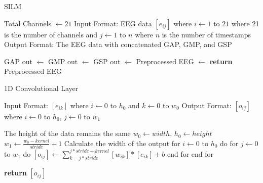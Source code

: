 \documentclass[10pt]{article}
\begin{document}
\begin{algorithm}[H]
\caption{SILM}
    \begin{algorithmic}[2]
     
        \State Total Channels $\gets 21$
        \State Input Format: EEG data $[e_{ij}]$ where $i \gets 1$ to $21$ where 21 is the number of channels
        \State and $j \gets 1$ to $n$ where $n$ is the number of timestamps
        \State 
        \State Output Format: The EEG data with concatenated GAP, GMP, and GSP
        \State

        \State GAP out $\gets$  
        \State GMP out $\gets$  
        \State GSP out $\gets$  
        \State Preprocessed EEG $\gets$  
        \State \textbf{return} Preprocessed EEG 
    \EndProcedure
    \end{algorithmic}
\end{algorithm}

\begin{algorithm}[H]
  \caption{1D Convolutional Layer}
  \begin{algorithmic}[3]
      \State Input Format: $[e_{ik}]$ where $i \gets 0$ to $h_0$ and $k \gets 0$ to $w_0$
      \State Output Format: $[o_{ij}]$ where $i \gets 0$ to $h_0$, $j \gets 0$ to $w_1$

      \Comment The height of the data remains the same
      \State $w_0 \gets width$, $h_0 \gets height$
      \State $w_1 \gets \frac{w_0 - kernel}{stride} + 1$  \Comment Calculate the width of the output
      \State for $i \gets 0$ to $h_0$ do
      \State \hspace{1cm} for $j \gets 0$ to $w_1$ do
      \State \hspace{2cm} $[o_{ij}] \gets \sum_{k=j*stride}^{j*stride + kernel} [w_{ik}] * [e_{ik}] + b$ 
      \State \hspace{1cm} end for
      \State end for

      \State \textbf{return} $[o_{ij}]$
      \EndProcedure
  \end{algorithmic}
\end{algorithm}
\end{document}
